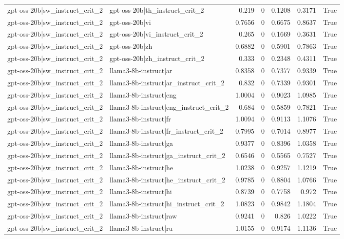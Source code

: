 \begin{table}
\begin{tabular}{l l r r r r l}
gpt-oss-20b|sw_instruct_crit_2 & gpt-oss-20b|th_instruct_crit_2 & 0.219 & 0 & 0.1208 & 0.3171 & True \\
gpt-oss-20b|sw_instruct_crit_2 & gpt-oss-20b|vi & 0.7656 & 0 & 0.6675 & 0.8637 & True \\
gpt-oss-20b|sw_instruct_crit_2 & gpt-oss-20b|vi_instruct_crit_2 & 0.265 & 0 & 0.1669 & 0.3631 & True \\
gpt-oss-20b|sw_instruct_crit_2 & gpt-oss-20b|zh & 0.6882 & 0 & 0.5901 & 0.7863 & True \\
gpt-oss-20b|sw_instruct_crit_2 & gpt-oss-20b|zh_instruct_crit_2 & 0.333 & 0 & 0.2348 & 0.4311 & True \\
gpt-oss-20b|sw_instruct_crit_2 & llama3-8b-instruct|ar & 0.8358 & 0 & 0.7377 & 0.9339 & True \\
gpt-oss-20b|sw_instruct_crit_2 & llama3-8b-instruct|ar_instruct_crit_2 & 0.832 & 0 & 0.7339 & 0.9301 & True \\
gpt-oss-20b|sw_instruct_crit_2 & llama3-8b-instruct|eng & 1.0004 & 0 & 0.9023 & 1.0985 & True \\
gpt-oss-20b|sw_instruct_crit_2 & llama3-8b-instruct|eng_instruct_crit_2 & 0.684 & 0 & 0.5859 & 0.7821 & True \\
gpt-oss-20b|sw_instruct_crit_2 & llama3-8b-instruct|fr & 1.0094 & 0 & 0.9113 & 1.1076 & True \\
gpt-oss-20b|sw_instruct_crit_2 & llama3-8b-instruct|fr_instruct_crit_2 & 0.7995 & 0 & 0.7014 & 0.8977 & True \\
gpt-oss-20b|sw_instruct_crit_2 & llama3-8b-instruct|ga & 0.9377 & 0 & 0.8396 & 1.0358 & True \\
gpt-oss-20b|sw_instruct_crit_2 & llama3-8b-instruct|ga_instruct_crit_2 & 0.6546 & 0 & 0.5565 & 0.7527 & True \\
gpt-oss-20b|sw_instruct_crit_2 & llama3-8b-instruct|he & 1.0238 & 0 & 0.9257 & 1.1219 & True \\
gpt-oss-20b|sw_instruct_crit_2 & llama3-8b-instruct|he_instruct_crit_2 & 0.9785 & 0 & 0.8804 & 1.0766 & True \\
gpt-oss-20b|sw_instruct_crit_2 & llama3-8b-instruct|hi & 0.8739 & 0 & 0.7758 & 0.972 & True \\
gpt-oss-20b|sw_instruct_crit_2 & llama3-8b-instruct|hi_instruct_crit_2 & 1.0823 & 0 & 0.9842 & 1.1804 & True \\
gpt-oss-20b|sw_instruct_crit_2 & llama3-8b-instruct|raw & 0.9241 & 0 & 0.826 & 1.0222 & True \\
gpt-oss-20b|sw_instruct_crit_2 & llama3-8b-instruct|ru & 1.0155 & 0 & 0.9174 & 1.1136 & True \\

\end{tabular}
\end{table}
